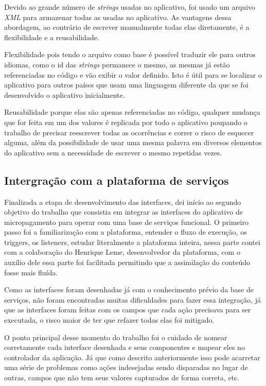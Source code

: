 \documentclass[hidelinks,12pt]{article}
\begin{document}
Devido ao grande n\'umero de \textit{strings} usadas no aplicativo, foi usado um arquivo \textit{XML} para armazenar todas as usadas no aplicativo. As vantagens dessa abordagem, ao contr\'ario de escrever manualmente todas elas diretamente, \'e a flexibilidade e a reusabilidade.

Flexibilidade pois tendo o arquivo como base \'e poss\'ivel traduzir ele para outros idiomas, como o id das \textit{strings} permanece o mesmo, as mesmas j\'a est\~ao referenciadas no c\'odigo e v\~ao exibir o valor definido. Isto \'e \'util para se localizar o aplicativo para outros pa\'ises que usam uma linguagem diferente da que se foi desenvolvido o aplicativo inicialmente.

Reusabilidade porque elas s\~ao apenas referenciadas no c\'odigo, qualquer mudan\c{c}a que for feita em um dos valores \'e replicada por todo o aplicativo poupando o trabalho de precisar reescrever todas as ocorrências e correr o risco de esquecer alguma, al\'em da possibilidade de usar uma mesma palavra em diversos elementos do aplicativo sem a necessidade de escrever o mesmo repetidas vezes.
\subsection{Intergra\c{c}\~ao com a plataforma de servi\c{c}os} \label{dev}

Finalizada a etapa de desenvolvimento das interfaces, dei in\'icio ao segundo objetivo do trabalho que consistia em integrar as interfaces do aplicativo de micropagamento para operar com uma base de servi\c{c}os funcional. O primeiro passo foi a familiariza\c{c}\~ao com a plataforma, entender o fluxo de execu\c{c}\~ao, os triggers, os listeners, estudar literalmente a plataforma inteira, nessa parte contei com a colabora\c{c}\~ao do Henrique Leme, desenvolvedor da plataforma, com o aux\'ilio dele essa parte foi facilitada permitindo que a assimila\c{c}\~ao do conte\'udo fosse mais flu\'ida.

Como as interfaces foram desenhadas j\'a com o conhecimento pr\'evio da base de servi\c{c}os, n\~ao foram encontradas muitas dificuldades para fazer essa integra\c{c}\~ao, j\'a que as interfaces foram feitas com os campos que cada a\c{c}\~ao precisava para ser executada, o risco maior de ter que refazer todas elas foi mitigado.

O ponto principal desse momento do trabalho foi o cuidado de nomear corretamente cada interface desenhada e seus componentes e mapear eles no controlador da aplica\c{c}\~ao. J\'a que como descrito anteriormente isso pode acarretar uma s\'erie de problemas como a\c{c}\~oes indesejadas sendo disparadas no lugar de outras, campos que n\~ao tem seus valores capturados de forma correta, etc.
\end{document}
